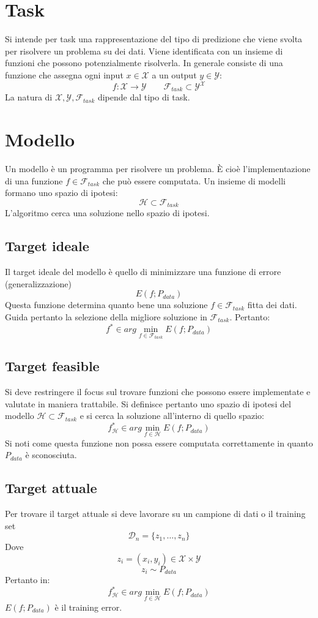 \section{Task}
Si intende per task una rappresentazione del tipo di predizione che viene svolta per risolvere un problema su dei dati.
Viene identificata con un insieme di funzioni che possono potenzialmente risolverla.
In generale consiste di una funzione che assegna ogni input $x\in\mathcal{X}$ a un output $y\in\mathcal{Y}$:
$$f:\mathcal{X}\rightarrow\mathcal{Y}\qquad\mathcal{F}_{task}\subset\mathcal{Y^X}$$
La natura di $\mathcal{X},\mathcal{Y}, \mathcal{F}_{task}$ dipende dal tipo di task.

\section{Modello}
Un modello \`e un programma per risolvere un problema.
\`E cio\`e l'implementazione di una funzione $f\in\mathcal{F}_{task}$ che pu\`o essere computata.
Un insieme di modelli formano uno spazio di ipotesi:
$$\mathcal{H}\subset\mathcal{F}_{task}$$
L'algoritmo cerca una soluzione nello spazio di ipotesi.

	\subsection{Target ideale}
	Il target ideale del modello \`e quello di minimizzare una funzione di errore (generalizzazione)
	$$E(f;P_{data})$$
	Questa funzione determina quanto bene una soluzione $f\in\mathcal{F}_{task}$ fitta dei dati.
	Guida pertanto la selezione della migliore soluzione in $\mathcal{F}_{task}$.
	Pertanto:
	$$f^*\in arg\min\limits_{f\in\mathcal{F}_{task}}E(f;P_{data})$$

	\subsection{Target feasible}
	Si deve restringere il focus sul trovare funzioni che possono essere implementate e valutate in maniera trattabile.
	Si definisce pertanto uno spazio di ipotesi del modello $\mathcal{H}\subset\mathcal{F}_{task}$ e si cerca la soluzione all'interno di quello spazio:
	$$f^*_{\mathcal{H}}\in arg\min\limits_{f\in\mathcal{H}} E(f;P_{data})$$
	Si noti come questa funzione non possa essere computata correttamente in quanto $P_{data}$ \`e sconosciuta.

	\subsection{Target attuale}
	Per trovare il target attuale si deve lavorare su un campione di dati o il training set
	$$\mathcal{D}_n=\{z_1,\dots,z_n\}$$
	Dove
	$$z_i=(x_i,y_i)\in\mathcal{X}\times\mathcal{Y}$$
	$$z_i\sim P_{data}$$
	Pertanto in:
	$$f^*_{\mathcal{H}}\in arg\min\limits_{f\in\mathcal{H}} E(f;P_{data})$$
	$E(f;P_{data})$ \`e il training error.

